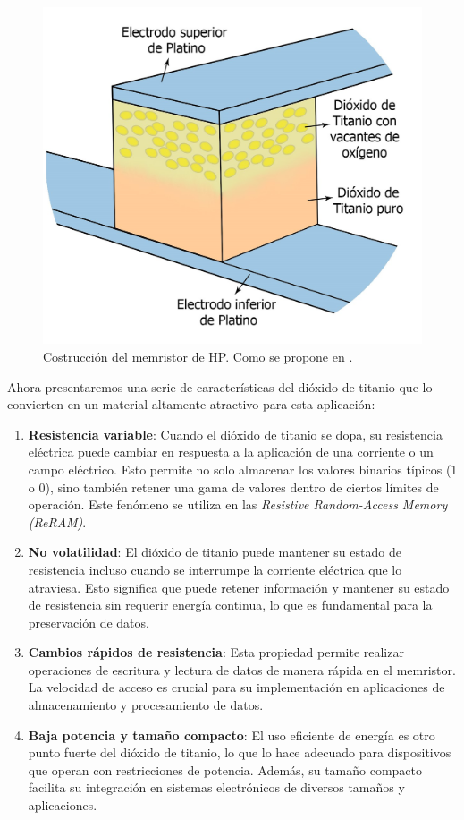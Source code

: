 \documentclass[12pt,a4paper]{report} %
\begin{document}
\vspace{0.5cm}\begin{figure}[h]
		\centering
		\includegraphics[width=1\textwidth]{mem1.jpg}
		\caption{Costrucción del memristor de HP. Como se propone en \cite{williams}.}
		\label{fig:mem1}
	\end{figure}\smallskip
	
	\newpage
	
	Ahora presentaremos una serie de características del dióxido de titanio que lo convierten en un material altamente atractivo para esta aplicación:
	
	\begin{enumerate}
		\item \textbf{Resistencia variable}: Cuando el dióxido de titanio se dopa, su resistencia eléctrica puede cambiar en respuesta a la aplicación de una corriente o un campo eléctrico. Esto permite no solo almacenar los valores binarios típicos (1 o 0), sino también retener una gama de valores dentro de ciertos límites de operación. Este fenómeno se utiliza en las \textit{Resistive Random-Access Memory (ReRAM)}.
		\item \textbf{No volatilidad}: El dióxido de titanio puede mantener su estado de resistencia incluso cuando se interrumpe la corriente eléctrica que lo atraviesa. Esto significa que puede retener información y mantener su estado de resistencia sin requerir energía continua, lo que es fundamental para la preservación de datos.
		\item \textbf{Cambios rápidos de resistencia}: Esta propiedad permite realizar operaciones de escritura y lectura de datos de manera rápida en el memristor. La velocidad de acceso es crucial para su implementación en aplicaciones de almacenamiento y procesamiento de datos.
		\item \textbf{Baja potencia y tamaño compacto}: El uso eficiente de energía es otro punto fuerte del dióxido de titanio, lo que lo hace adecuado para dispositivos que operan con restricciones de potencia. Además, su tamaño compacto facilita su integración en sistemas electrónicos de diversos tamaños y aplicaciones.
	\end{enumerate}
	
\end{document}
